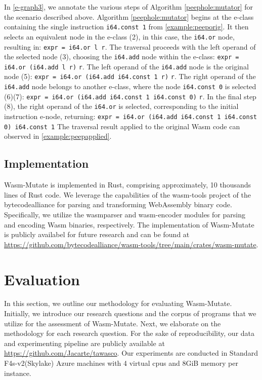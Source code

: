 \documentclass[sigplan,screen]{acmart}
\newcommand{\tool}{{\sc Wasm-Mutate}\xspace}
\newcommand{\repourl}{\url{https://github.com/bytecodealliance/wasm-tools/tree/main/crates/wasm-mutate}}
\newcommand{\dataurl}{\url{https://github.com/Jacarte/tawasco}}
\begin{document}
In \autoref{e-graph3}, we annotate the various steps of Algorithm \ref{peephole:mutator} 
for the scenario  described above. Algorithm \ref{peephole:mutator} begins at the e-class containing the single instruction \texttt{i64.const 1} from \autoref{example:peeporig}. 
It then selects an equivalent node in the e-class (2), in this case, the \texttt{i64.or} node, resulting in:
{\texttt{expr = i64.or l r}}.
The traversal proceeds with the left operand of the selected node (3), choosing the \texttt{i64.add} node within the e-class: 
{\texttt{expr = i64.or (i64.add l r)} \texttt{r}}.
The left operand of the \texttt{i64.add} node is the original node (5): 
{\texttt{expr = i64.or (i64.add i64.const 1 r)} \texttt{r}}.
The right operand of the \texttt{i64.add} node belongs to another e-class, where the node \texttt{i64.const 0} is selected (6)(7):
{\texttt{expr = i64.or (i64.add i64.const 1 i64.const 0)} \texttt{r}}.
In the final step (8), the right operand of the \texttt{i64.or} is selected, corresponding to the initial instruction e-node, returning:
{\texttt{expr = i64.or (i64.add i64.const 1 i64.const 0)\ i64.const 1}}
The traversal result applied to the original Wasm code can observed in \autoref{example:peepapplied}. 

\subsection{Implementation}

\tool is implemented in Rust, comprising approximately, 10 thousands lines of Rust code. 
We leverage the capabilities of the wasm-tools project of the bytecodealliance for parsing and transforming WebAssembly binary code. 
Specifically, we utilize the wasmparser and wasm-encoder modules for parsing and encoding Wasm binaries, respectively.
The implementation of \tool is publicly availabel for future research and can be found at \repourl.



\section {Evaluation}
\label{eval}

In this section, we outline our methodology for evaluating \tool.
Initially, we introduce our research questions and the corpus of programs that we utilize for the assessment of \tool.
Next, we elaborate on the methodology for each research question.
For the sake of reproducibility, our data and experimenting pipeline are publicly available at \dataurl.
Our experiments are conducted in Standard F4s-v2(Skylake) Azure machines with 4 virtual cpus and 8GiB memory per instance.
\end{document}

